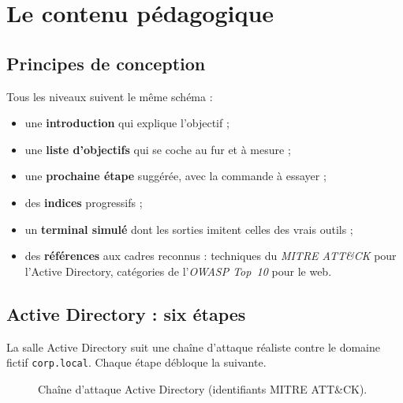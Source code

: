 \documentclass[11pt,a4paper]{report}
\begin{document}
\chapter{Le contenu p\'edagogique}
\label{chap:peda}

\section{Principes de conception}

Tous les niveaux suivent le m\^eme sch\'ema :
\begin{itemize}
  \item une \textbf{introduction} qui explique l'objectif ;
  \item une \textbf{liste d'objectifs} qui se coche au fur et \`a mesure ;
  \item une \textbf{prochaine \'etape} sugg\'er\'ee, avec la commande \`a essayer ;
  \item des \textbf{indices} progressifs ;
  \item un \textbf{terminal simul\'e} dont les sorties imitent celles des vrais outils ;
  \item des \textbf{r\'ef\'erences} aux cadres reconnus : techniques du
        \emph{MITRE ATT\&CK} pour l'Active Directory, cat\'egories de l'\emph{OWASP
        Top~10} pour le web.
\end{itemize}

\section{Active Directory : six \'etapes}

La salle Active Directory suit une cha\^ine d'attaque r\'ealiste contre le domaine
fictif \texttt{corp.local}. Chaque \'etape d\'ebloque la suivante.

\begin{figure}[htbp]
\centering
{}
\caption{Cha\^ine d'attaque Active Directory (identifiants MITRE ATT\&CK).}
\end{figure}
\end{document}

